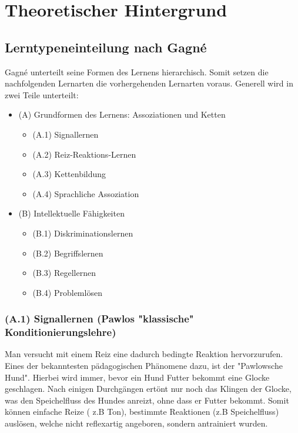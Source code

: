 \chapter{Theoretischer Hintergrund}

\section{Lerntypeneinteilung nach Gagné}

Gagné unterteilt seine Formen des Lernens hierarchisch. Somit setzen die nachfolgenden Lernarten die vorhergehenden Lernarten voraus. Generell wird in zwei Teile unterteilt: 


\begin{itemize}
\item (A) Grundformen des Lernens: Assoziationen und Ketten 
    \begin{itemize}
        \item (A.1) Signallernen
        \item (A.2) Reiz-Reaktions-Lernen
        \item (A.3) Kettenbildung
        \item (A.4) Sprachliche Assoziation
    \end{itemize}
\item (B) Intellektuelle Fähigkeiten
    \begin{itemize}
        \item (B.1) Diskriminationslernen
        \item (B.2) Begriffslernen
        \item (B.3) Regellernen 
        \item (B.4) Problemlösen
    \end{itemize}
\end{itemize}

\subsection[]{(A.1) Signallernen (Pawlos "klassische" Konditionierungslehre)}

Man versucht mit einem Reiz eine dadurch bedingte Reaktion hervorzurufen. Eines der bekanntesten pädagogischen Phänomene dazu, ist der "Pawlowsche Hund". Hierbei wird immer, bevor ein Hund Futter bekommt eine Glocke geschlagen. Nach einigen Durchgängen ertönt nur noch das Klingen der Glocke, was den Speichelfluss des Hundes anreizt, ohne dass er Futter bekommt. Somit können einfache Reize ( z.B Ton), bestimmte Reaktionen (z.B Speichelfluss) auslösen, welche nicht reflexartig angeboren, sondern antrainiert wurden\cite{pawlow1977klassische}.

